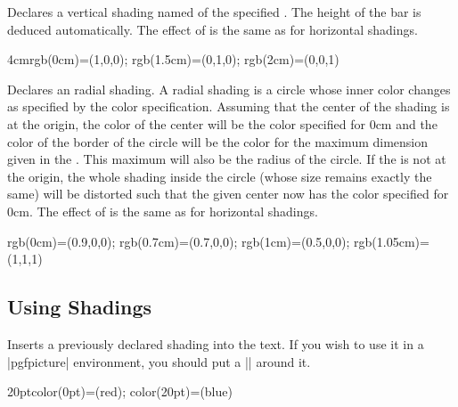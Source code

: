 \begin{command}{\pgfdeclareverticalshading{}}
   Declares a vertical shading named  of the
   specified . The height of the bar is deduced
   automatically. The effect of  is the same as for
   horizontal shadings.

\begin{codeexample}[]
  {4cm}{rgb(0cm)=(1,0,0); rgb(1.5cm)=(0,1,0); rgb(2cm)=(0,0,1)}
\end{codeexample}
\end{command}


\begin{command}{\pgfdeclareradialshading{}}
  Declares an radial shading. A radial shading is a circle whose inner
  color changes as specified by the color specification. Assuming that
  the center of the shading is at the origin, the color of the center
  will be the color specified for 0cm and the color of the border of
  the circle will be the color for the maximum dimension given in
  the . This maximum will also be the radius of
  the circle. If the  is not at the 
  origin, the whole shading inside the circle (whose size remains
  exactly the same) will be distorted such that the given center now
  has the color specified for 0cm. The effect of  is
  the same as for horizontal shadings. 

\begin{codeexample}[]  
%
  {rgb(0cm)=(0.9,0,0);
   rgb(0.7cm)=(0.7,0,0);
   rgb(1cm)=(0.5,0,0);
   rgb(1.05cm)=(1,1,1)}
\end{codeexample}
\end{command}


\subsection{Using Shadings}
\label{section-shading-a-path}

\begin{command}{\pgfuseshading{}}
  Inserts a previously declared shading into the text. If you wish to
  use it in a |pgfpicture| environment, you should put a |\pgfbox|
  around it.
  
\begin{codeexample}[]
\begin{pgfpicture}
    {20pt}{color(0pt)=(red); color(20pt)=(blue)}
\end{pgfpicture}
\end{codeexample}
\end{command}

